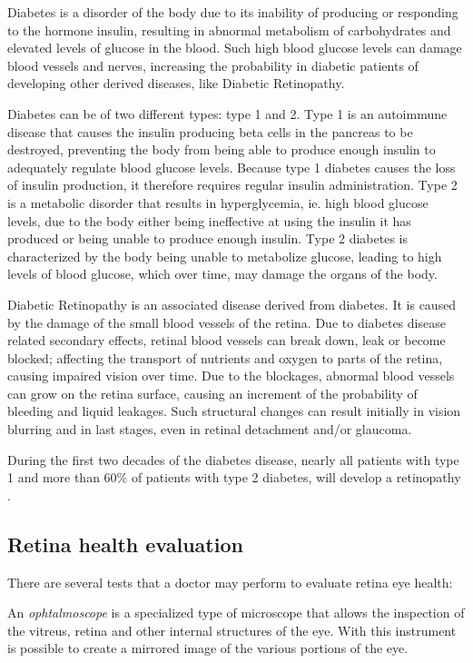 Diabetes is a disorder of the body due to its inability of producing or responding to the hormone insulin, resulting in abnormal metabolism of carbohydrates and elevated levels of glucose in the blood. Such high blood glucose levels can damage blood vessels and nerves, increasing the probability in diabetic patients of developing other derived diseases, like Diabetic Retinopathy. 

Diabetes can be of two different types: type 1 and 2. Type 1 is an autoimmune disease that causes the insulin producing beta cells in the pancreas to be destroyed, preventing the body from being able to produce enough insulin to adequately regulate blood glucose levels. Because type 1 diabetes causes the loss of insulin production, it therefore requires regular insulin administration. Type 2 is a metabolic disorder that results in hyperglycemia, ie. high blood glucose levels, due to the body either being ineffective at using the insulin it has produced or being unable to produce enough insulin. Type 2 diabetes is characterized by the body being unable to metabolize glucose, leading to high levels of blood glucose, which over time, may damage the organs of the body. \citep{www.diabetes.co.uk}

Diabetic Retinopathy is an associated disease derived from diabetes. It is caused by the damage of the small blood vessels of the retina. Due to diabetes disease related secondary effects, retinal blood vessels can break down, leak or become blocked; affecting the transport of nutrients and oxygen to parts of the retina, causing impaired vision over time. Due to the blockages, abnormal blood vessels can grow on the retina surface, causing an increment of the probability of bleeding and liquid leakages. Such structural changes can result initially in vision blurring and in last stages, even in retinal detachment and/or glaucoma. 

During the first two decades of the diabetes disease, nearly all patients with type 1 and more than 60\% of patients with type 2 diabetes, will develop a retinopathy \citep{fong2004retinopathy}. 

\subsection{Retina health evaluation}

There are several tests that a doctor may perform to evaluate retina eye health:

An \emph{ophtalmoscope} is a specialized type of microscope that allows the inspection of the vitreus, retina and other internal structures of the eye. With this instrument is possible to create a mirrored image of the various portions of the eye.

